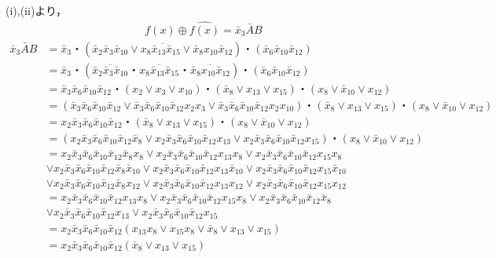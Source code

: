 \documentclass[dvipdfmx,a4paper,12pt]{jsarticle}
\begin{document}
(i),(ii)より，
\begin{gather*}
f(x) \oplus \hat{f(x)} =  \bar{x}_{3}\bar{A}B 
\end{gather*}  
\begin{align*}
 \bar{x}_{3}\bar{A}B &= \bar{x}_{3}・(\overline{\bar{x}_{2}\bar{x}_{3}\bar{x}_{10}\lor x_{8}\bar{x}_{13}\bar{x}_{15}\lor \bar{x}_{8}x_{10}\bar{x}_{12}})・(\bar{x}_{6}\bar{x}_{10}\bar{x}_{12}) \\
 & = \bar{x}_{3}・(\overline{\bar{x}_{2}\bar{x}_{3}\bar{x}_{10}}・ \overline{x_{8}\bar{x}_{13}\bar{x}_{15}}・ \overline{\bar{x}_{8}x_{10}\bar{x}_{12}})・(\bar{x}_{6}\bar{x}_{10}\bar{x}_{12}) \\
 & = \bar{x}_{3}\bar{x}_{6}\bar{x}_{10}\bar{x}_{12}・(x_{2} \lor x_{3} \lor x_{10})・(\bar{x}_{8} \lor x_{13} \lor x_{15})・(x_{8} \lor \bar{x}_{10} \lor x_{12}) \\
 & = (\bar{x}_{3}\bar{x}_{6}\bar{x}_{10}\bar{x}_{12} \lor \bar{x}_{3}\bar{x}_{6}\bar{x}_{10}\bar{x}_{12}x_{2}x_{3} \lor \bar{x}_{3}\bar{x}_{6}\bar{x}_{10}\bar{x}_{12}x_{2}x_{10})・(\bar{x}_{8} \lor x_{13} \lor x_{15})・(x_{8} \lor \bar{x}_{10} \lor x_{12}) \\
& = x_{2} \bar{x}_{3}\bar{x}_{6}\bar{x}_{10}\bar{x}_{12}・(\bar{x}_{8} \lor x_{13} \lor x_{15})・(x_{8} \lor \bar{x}_{10} \lor x_{12}) \\
& = (x_{2} \bar{x}_{3}\bar{x}_{6}\bar{x}_{10}\bar{x}_{12}\bar{x}_{8} \lor x_{2} \bar{x}_{3}\bar{x}_{6}\bar{x}_{10}\bar{x}_{12}x_{13} \lor x_{2} \bar{x}_{3}\bar{x}_{6}\bar{x}_{10}\bar{x}_{12}x_{15})・(x_{8} \lor \bar{x}_{10} \lor x_{12}) \\
& = x_{2}\bar{x}_{3}\bar{x}_{6}\bar{x}_{10}\bar{x}_{12}\bar{x}_{8}x_{8} \lor x_{2} \bar{x}_{3}\bar{x}_{6}\bar{x}_{10}\bar{x}_{12}x_{13}x_{8} \lor x_{2} \bar{x}_{3}\bar{x}_{6}\bar{x}_{10}\bar{x}_{12}x_{15}x_{8}  \\
 & \lor x_{2} \bar{x}_{3}\bar{x}_{6}\bar{x}_{10}\bar{x}_{12}\bar{x}_{8}\bar{x}_{10} \lor x_{2} \bar{x}_{3}\bar{x}_{6}\bar{x}_{10}\bar{x}_{12}x_{13}\bar{x}_{10} \lor x_{2} \bar{x}_{3}\bar{x}_{6}\bar{x}_{10}\bar{x}_{12}x_{15}\bar{x}_{10} \\
 &  \lor x_{2} \bar{x}_{3}\bar{x}_{6}\bar{x}_{10}\bar{x}_{12}\bar{x}_{8}x_{12} \lor x_{2} \bar{x}_{3}\bar{x}_{6}\bar{x}_{10}\bar{x}_{12}x_{13}x_{12} \lor x_{2} \bar{x}_{3}\bar{x}_{6}\bar{x}_{10}\bar{x}_{12}x_{15}x_{12} \\
 & =   x_{2} \bar{x}_{3}\bar{x}_{6}\bar{x}_{10}\bar{x}_{12}x_{13}x_{8} \lor x_{2} \bar{x}_{3}\bar{x}_{6}\bar{x}_{10}\bar{x}_{12}x_{15}x_{8}  \lor x_{2} \bar{x}_{3}\bar{x}_{6}\bar{x}_{10}\bar{x}_{12}\bar{x}_{8} \\
 &  \lor x_{2} \bar{x}_{3}\bar{x}_{6}\bar{x}_{10}\bar{x}_{12}x_{13} \lor x_{2} \bar{x}_{3}\bar{x}_{6}\bar{x}_{10}\bar{x}_{12}x_{15} \\
 & =   x_{2}\bar{x}_{3}\bar{x}_{6}\bar{x}_{10}\bar{x}_{12}(x_{13}x_{8} \lor x_{15}x_{8}  \lor \bar{x}_{8} \lor x_{13} \lor x_{15}) \\
 & =   x_{2}\bar{x}_{3}\bar{x}_{6}\bar{x}_{10}\bar{x}_{12}(\bar{x}_{8} \lor x_{13} \lor x_{15}) \\
 \end{align*}  
\end{document}
